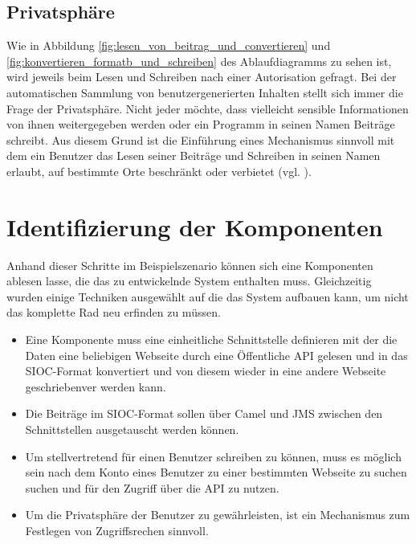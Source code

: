 
\subsection{Privatsphäre} %
\label{sub:privatsphäre}

Wie in Abbildung \ref{fig:lesen_von_beitrag_und_convertieren} und \ref{fig:konvertieren_formatb_und_schreiben} des Ablaufdiagramms zu sehen ist, wird jeweils beim Lesen und Schreiben nach einer Autorisation gefragt. Bei der automatischen Sammlung von benutzergenerierten Inhalten stellt sich immer die Frage der Privatsphäre. Nicht jeder möchte, dass vielleicht sensible Informationen von ihnen weitergegeben werden oder ein Programm in seinen Namen Beiträge schreibt. Aus diesem Grund ist die Einführung eines Mechanismus sinnvoll mit dem ein Benutzer das Lesen seiner Beiträge und Schreiben in seinen Namen erlaubt, auf bestimmte Orte beschränkt oder verbietet (vgl. \cite[S.\,7]{Bojars2011}). 


\section{Identifizierung der Komponenten} %
\label{sec:identifizierung_der_komponenten}

Anhand dieser Schritte im Beispielszenario können sich eine Komponenten ablesen lasse, die das zu entwickelnde System enthalten muss. Gleichzeitig wurden einige Techniken ausgewählt auf die das System aufbauen kann, um nicht das komplette Rad neu erfinden zu müssen. 

\begin{itemize} 
    \item Eine Komponente muss eine einheitliche Schnittstelle definieren mit der die Daten eine beliebigen Webseite durch eine Öffentliche API gelesen und in das SIOC-Format konvertiert und von diesem wieder in eine andere Webseite geschriebenver werden kann. 

    \item Die Beiträge im SIOC-Format sollen über Camel und JMS zwischen den Schnittstellen ausgetauscht werden können.

    \item Um stellvertretend für einen Benutzer schreiben zu können, muss es möglich sein nach dem Konto eines Benutzer zu einer bestimmten Webseite zu suchen suchen und für den Zugriff über die API zu nutzen.

    \item Um die Privatsphäre der Benutzer zu gewährleisten, ist ein Mechanismus zum Festlegen von Zugriffsrechen sinnvoll.
\end{itemize}   


